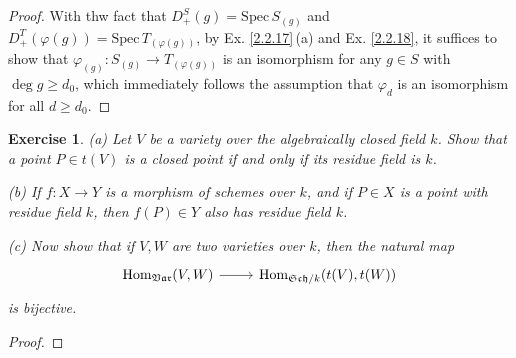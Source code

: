 \documentclass{amsart}
\newtheorem{exe}{Exercise}[subsection]
\theoremstyle{remark}\newtheorem{rmk}[theorem]{Remark}
\begin{document}
\begin{proof}
   With thw fact that $D^S_+(g)=\mathrm{Spec}\,S_{(g)}$ and $D^T_+(\varphi(g))=\mathrm{Spec}\,T_{(\varphi(g))}$, by Ex. \ref{2.2.17}\,(a) and Ex. \ref{2.2.18}, it suffices to show that $\varphi_{(g)}:S_{(g)}\to T_{(\varphi(g))}$ is an isomorphism for any $g\in S$ with $\deg g\geq d_0$, which immediately follows the assumption that $\varphi_d$ is an isomorphism for all $d\geq d_0$.
\end{proof}

\begin{exe}
   (a) Let $V$ be a variety over the algebraically closed field $k$. Show that a point $P \in t(V)$ is a closed point if and only if its residue field is $k$.
   
   (b) If $f : X \to Y$ is a morphism of schemes over $k$, and if $P \in X$ is a point with residue field $k$, then $f(P) \in Y$ also has residue field $k$.
   
   (c) Now show that if $V,W$ are two varieties over $k$, then the natural map 
   \begin{equation*}
   	\begin{tikzcd}
   		{\mathrm{Hom}_{\mathfrak{Var}}(V,W)} \arrow[r] & {\mathrm{Hom}_{\mathfrak{Sch}/k}(t(V),t(W))}
   	\end{tikzcd}
   \end{equation*}
   is bijective.
\end{exe}

\begin{proof}
   
\end{proof}
\end{document}
